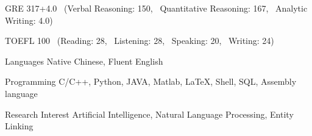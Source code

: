 

\begin{cvskills}


  \cvskill
    {GRE} %
    {317+4.0 \ (Verbal Reasoning: 150, \ Quantitative Reasoning: 167, \ Analytic Writing: 4.0)} %
    
  \cvskill
    {TOEFL} %
    {100 \  (Reading: 28, \ Listening: 28, \ Speaking: 20, \ Writing: 24)} %

  \cvskill
    {Languages} %
    {Native Chinese, Fluent English} %


  \cvskill
    {Programming} %
    {C/C++, Python, JAVA, Matlab, LaTeX, Shell, SQL, Assembly language} %

  \cvskill
    {Research Interest} %
    {Artificial Intelligence, Natural Language Processing, Entity Linking} %

\end{cvskills}

